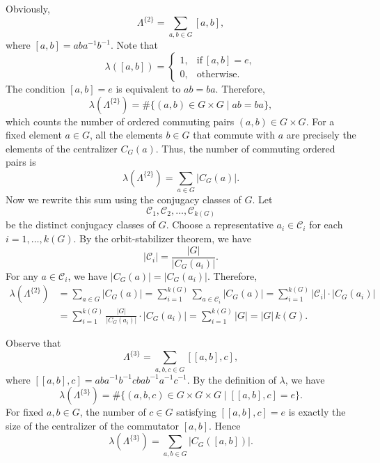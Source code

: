 \documentclass[11pt]{amsart}
\numberwithin{equation}{section}
\begin{document}
Obviously,
$$\Lambda^{\{2\}}=\sum_{a,b\in G}[a,b],$$where $[a,b]=aba^{-1}b^{-1}.$ Note that
\[
\lambda([a,b]) =
\begin{cases}
1, & \text{if}\ [a,b]=e,\\
0, & \text{otherwise}.
\end{cases}
\]
The condition $[a,b]=e$ is equivalent to $ab=ba$. Therefore, \begin{equation}\label{s1}\lambda(\Lambda^{\{2\}})=\#\{(a,b)\in G\times G\mid ab=ba\},\end{equation} which counts the number of ordered commuting pairs $(a,b)\in G\times G$.
For a fixed element $a\in G$, all the elements $b\in G$ that commute with $a$ are precisely the elements of the centralizer $C_G(a)$. Thus, the number of commuting ordered pairs is
\[
\lambda(\Lambda^{\{2\}})=\sum_{a\in G} |C_G(a)|.
\]
Now we rewrite this sum using the conjugacy classes of $G$. Let
\[
\mathcal{C}_1, \mathcal{C}_2, \dots, \mathcal{C}_{k(G)}
\]
be the distinct conjugacy classes of $G$. Choose a representative $a_i\in \mathcal{C}_i$ for each $i=1,\dots,k(G)$. By the orbit-stabilizer theorem, we have
\[
|\mathcal{C}_i| = \frac{|G|}{|C_G(a_i)|}.
\]
For any $a\in \mathcal{C}_i$, we have $|C_G(a)|=|C_G(a_i)|$. Therefore,
\begin{align}\label{s2}
\nonumber\lambda(\Lambda^{\{2\}})&=\sum_{a\in G} |C_G(a)|
= \sum_{i=1}^{k(G)} \sum_{a\in \mathcal{C}_i} |C_G(a)|
= \sum_{i=1}^{k(G)} |\mathcal{C}_i| \cdot |C_G(a_i)|\\
&= \sum_{i=1}^{k(G)} \frac{|G|}{|C_G(a_i)|} \cdot |C_G(a_i)|
= \sum_{i=1}^{k(G)} |G|
= |G|\, k(G).
\end{align}

Observe that
\[
\Lambda^{\{3\}}=\sum_{a,b,c\in G}[[a,b],c],
\] where $[[a,b],c]=aba^{-1}b^{-1}cbab^{-1}a^{-1}c^{-1}$.
By the definition of $\lambda$, we have
\[
\lambda(\Lambda^{\{3\}})
= \#\{(a,b,c)\in G\times G\times G \mid [[a,b],c]=e\}.
\]
For fixed $a,b\in G$, the number of $c\in G$ satisfying $[[a,b],c]=e$ is exactly the size of the centralizer of the commutator $[a,b]$. Hence
\[
\lambda(\Lambda^{\{3\}})=\sum_{a,b\in G} |C_G([a,b])|.
\]
\end{document}
